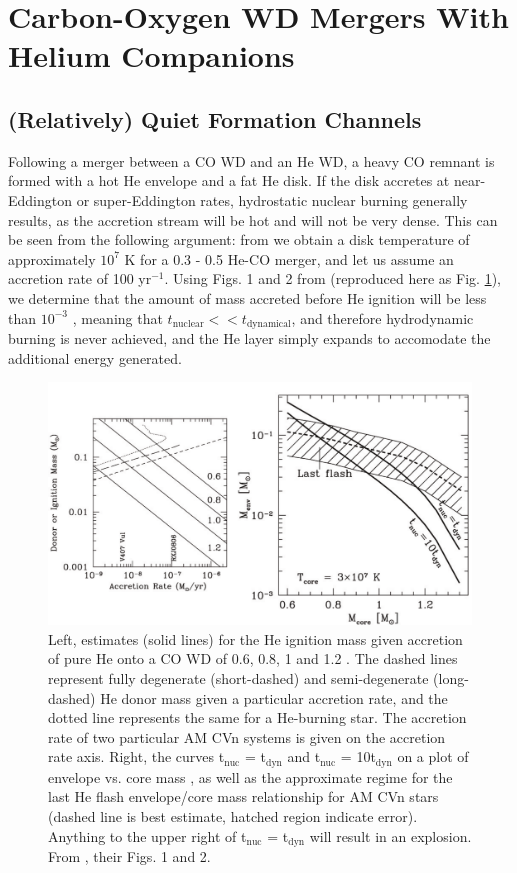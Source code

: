 \section{Carbon-Oxygen WD Mergers With Helium Companions}
\label{sec:withhecompanions}

\subsection{(Relatively) Quiet Formation Channels}

Following a merger between a CO WD and an He WD, a heavy CO remnant is formed with a hot He envelope and a fat He disk.  If the disk accretes at near-Eddington or super-Eddington rates, hydrostatic nuclear burning generally results, as the accretion stream will be hot and will not be very dense.  This can be seen from the following argument: from \cite{loreig09} we obtain a disk temperature of approximately $10^7$ K for a 0.3 - 0.5 {\Msun} He-CO merger, and let us assume an accretion rate of 100 {\Msun} yr$^{-1}$.  Using Figs. 1 and 2 from \cite{bild+07} (reproduced here as Fig. \ref{bildstenfig}), we determine that the amount of mass accreted before He ignition will be less than $10^{-3}$ {\Msun}, meaning that $t_{\mathrm{nuclear}} << t_{\mathrm{dynamical}}$, and therefore hydrodynamic burning is never achieved, and the He layer simply expands to accomodate the additional energy generated.

\begin{figure}
\centerline{\includegraphics[width=1.0\hsize]{bildstenfig.pdf}}
\caption{Left, estimates (solid lines) for the He ignition mass given accretion of pure He onto a CO WD of 0.6, 0.8, 1 and 1.2 {\Msun}.  The dashed lines represent fully degenerate (short-dashed) and semi-degenerate (long-dashed) He donor mass given a particular accretion rate, and the dotted line represents the same for a He-burning star.  The accretion rate of two particular AM CVn systems is given on the accretion rate axis.  Right, the curves t$_{\mathrm{nuc}}$  = t$_{\mathrm{dyn}}$ and t$_{\mathrm{nuc}}$  = 10t$_{\mathrm{dyn}}$ on a plot of envelope vs. core mass , as well as the approximate regime for the last He flash envelope/core mass relationship for AM CVn stars (dashed line is best estimate, hatched region indicate error).  Anything to the upper right of t$_{\mathrm{nuc}}$  = t$_{\mathrm{dyn}}$ will result in an explosion.  From \cite{bild+07}, their Figs. 1 and 2.}
\label{bildstenfig}
\end{figure}


